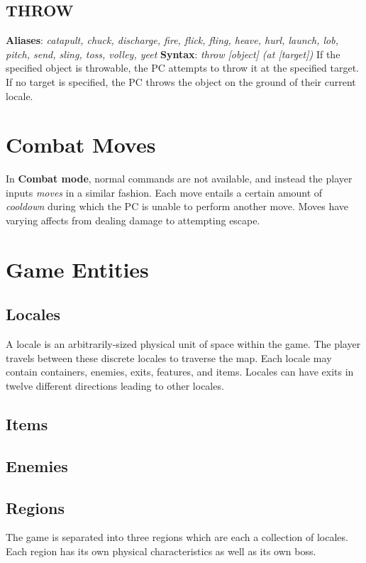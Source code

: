 \documentclass[11pt]{article}
\begin{document}
	\subsection{THROW}
	\textbf{Aliases}: \textit{catapult, chuck, discharge, fire, flick, fling, heave, hurl, launch, lob, pitch, send, sling, toss, volley, yeet}\newline
	\textbf{Syntax}: \textit{throw [object] (at [target])}\newline
	If the specified object is throwable, the PC attempts to throw it at the specified target. If no target is specified, the PC throws the object on the ground of their current locale.
	\section{Combat Moves}
	In \textbf{Combat mode}, normal commands are not available, and instead the player inputs \textit{moves} in a similar fashion. Each move entails a certain amount of \textit{cooldown} during which the PC is unable to perform another move. Moves have varying affects from dealing damage to attempting escape.
	\section{Game Entities}
	\subsection{Locales}
	
	A locale is an arbitrarily-sized physical unit of space within the game. The player travels between these discrete locales to traverse the map. Each locale may contain containers, enemies, exits, features, and items. Locales can have exits in twelve different directions leading to other locales.
	
	\subsection{Items}
	
	\subsection{Enemies}
	
	\subsection{Regions}
	
	The game is separated into three regions which are each a collection of locales. Each region has its own physical characteristics as well as its own boss.
	
\end{document}
